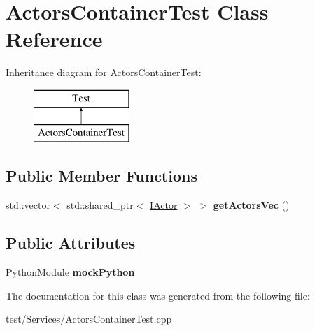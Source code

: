 \hypertarget{classActorsContainerTest}{}\section{Actors\+Container\+Test Class Reference}
\label{classActorsContainerTest}
Inheritance diagram for Actors\+Container\+Test\+:\begin{figure}[H]
\begin{center}
\leavevmode
\includegraphics[height=2.000000cm]{classActorsContainerTest}
\end{center}
\end{figure}
\subsection*{Public Member Functions}
\begin{DoxyCompactItemize}
\item 
std\+::vector$<$ std\+::shared\+\_\+ptr$<$ \hyperlink{classIActor}{I\+Actor} $>$ $>$ {\bfseries get\+Actors\+Vec} ()\hypertarget{classActorsContainerTest_a62bd5be2db86065af7ec583b2605475e}{}\label{classActorsContainerTest_a62bd5be2db86065af7ec583b2605475e}

\end{DoxyCompactItemize}
\subsection*{Public Attributes}
\begin{DoxyCompactItemize}
\item 
\hyperlink{classPythonModule}{Python\+Module} {\bfseries mock\+Python}\hypertarget{classActorsContainerTest_aa5fcefa886f5955c2a3461fbf08cba4e}{}\label{classActorsContainerTest_aa5fcefa886f5955c2a3461fbf08cba4e}

\end{DoxyCompactItemize}


The documentation for this class was generated from the following file\+:\begin{DoxyCompactItemize}
\item 
test/\+Services/Actors\+Container\+Test.\+cpp\end{DoxyCompactItemize}

